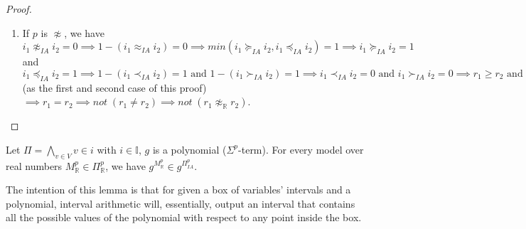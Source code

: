 \begin{proof}
\begin{enumerate}
\item \sloppy If $p$ is $\not\approx$, we have $i_1 \not\approx_{IA} i_2 = 0  \implies 1 - (i_1 \approx_{IA} i_2) = 0  \implies {min(i_1 \succeq_{IA} i_2, i_1 \preceq_{IA} i_2) = 1} \implies i_1 \succeq_{IA} i_2 = 1$ and $i_1 \preceq_{IA} i_2 = 1   \implies 1 - (i_1 \prec_{IA} i_2) = 1 \text{ and } 1 - (i_1 \succ_{IA} i_2) = 1  \implies {i_1 \prec_{IA} i_2 = 0  \text{ and } i_1 \succ_{IA} i_2 = 0}  \implies {r_1 \ge r_2} \text{ and } {r_1 \le r_2}$ (as the first and second case of this proof) $\implies r_1 = r_2 \implies not \; (r_1 \not= r_2) \implies not \; (r_1 \not\approx_\mathbb{R} r_2)$.
\end{enumerate}
\end{proof}

\begin{lemma} \label{lemma:IA-OT}
Let $\Pi = \bigwedge\limits_{v \in V}v \in i$ with $i \in \mathbb{I}$, $g$ is a polynomial ($\Sigma^p$-term). For every model over real numbers $M^p_\mathbb{R} \in \Pi^p_\mathbb{R}$, we have $g^{M^p_\mathbb{R}} \in g^{\Pi^p_{IA}}$.
\end{lemma}
The intention of this lemma is that for given a box of variables' intervals and a polynomial, interval arithmetic will, essentially, output an interval that contains all the possible values of the polynomial with respect to any point inside the box.
